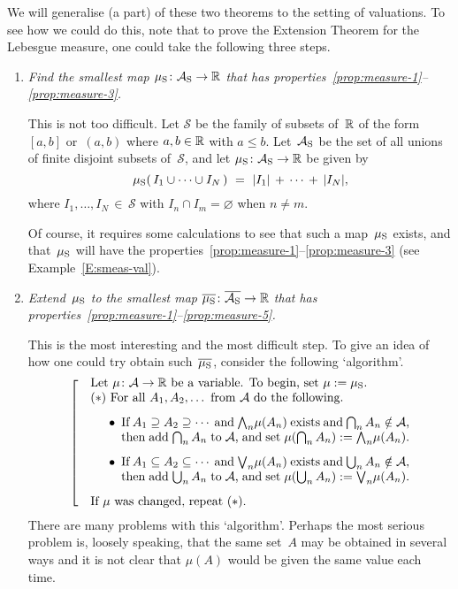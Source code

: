 \documentclass[main.tex]{subfiles}
\begin{document}
We will generalise (a part) of these two theorems
to the setting of valuations.
To see how we could do this,
note that to prove
the Extension Theorem for the Lebesgue measure,
one could take the following three steps.
\begin{enumerate}
\item
\label{extension-step-1}
\emph{Find the smallest map $\mu_{\mathrm{S}}\colon \mathcal{A}_{\mathrm{S}}\rightarrow \mathbb{R}$
that has properties~\ref{prop:measure-1}--\ref{prop:measure-3}.}

This is not too difficult.
Let $\mathcal{S}$ be the family of subsets of~$\mathbb{R}$ of
the form~$[a,b]$ or~$(a,b)$ where $a,b\in \mathbb{R}$ with $a\leq b$.
Let~$\mathcal{A}_{\mathrm{S}}$ be the set of all unions
of finite disjoint subsets of~$\mathcal{S}$,
and let $\mu_{\mathrm{S}}\colon \mathcal{A}_{\mathrm{S}}\rightarrow \mathbb{R}$
be given by
\begin{equation*}
\Smu(\,I_1 \cup\dotsb\cup I_N\,) \ = \ |I_1| \,+\,\dotsb\,+\,|I_N|,
\end{equation*}
where $I_1,\dotsc,I_N\,\in\, \mathcal{S}$
with $I_n\cap I_m = \varnothing$ when $n\neq m$.

Of course, it requires some calculations
to see that such a map~$\mu_{\mathrm{S}}$ exists,
and that~$\mu_{\mathrm{S}}$ will have the 
properties~\ref{prop:measure-1}--\ref{prop:measure-3}
(see Example~\ref{E:smeas-val}).

\item
\label{extension-step-2}
\emph{Extend~$\mu_{\mathrm{S}}$
to the smallest map $\overline{\mu_{\mathrm{S}}}\colon\overline{\mathcal{A}_{\mathrm{S}}}\rightarrow\mathbb{R}$
that has properties~\ref{prop:measure-1}--\ref{prop:measure-5}.}

This is the most interesting and the most difficult step.
To give an idea of how one could try obtain such~$\overline{\mu_{\mathrm{S}}}$,
consider the following `algorithm'.
\begin{equation*}
\left[\quad
\begin{minipage}{.75\columnwidth}
Let $\mu\colon\mathcal{A} \ra \R$
be a variable. To begin, set $\mu \eqdf \Smu$.\\
$\mathbf{(*)}$ For all~$A_1,A_2,\dotsc$ from~$\mathcal{A}$ 
do the following.
\begin{enumerate}
\item[$\bullet$] If $A_1 \supseteq A_2 \supseteq \dotsb$
and  $\bw_n \mu(A_n)$ exists
and  $\bigcap_n A_n \notin \mathcal{A}$,\\
then add $\bigcap_n A_n$ to~$\mathcal{A}$,
and set $\mu(\bigcap_n A_n) \eqdf \bw_n \mu(A_n)$.
\item[$\bullet$] If $A_1 \subseteq A_2 \subseteq \dotsb$
and  $\bv_n \mu(A_n)$ exists
and  $\bigcup_n A_n \notin \mathcal{A}$,\\
then add $\bigcup_n A_n$ to~$\mathcal{A}$,
and set $\mu(\bigcup_n A_n) \eqdf \bv_n \mu(A_n)$.
\end{enumerate}
If~$\mu$ was changed, repeat~$\mathbf{(*)}$.
\end{minipage}
\right.
\end{equation*}
There are many problems with this `algorithm'.
Perhaps the most serious problem
is, loosely speaking, that the same set~$A$ may be obtained
in several ways
and it is not clear that
$\mu(A)$ would be given the same value each time.


\end{enumerate}
\end{document}
